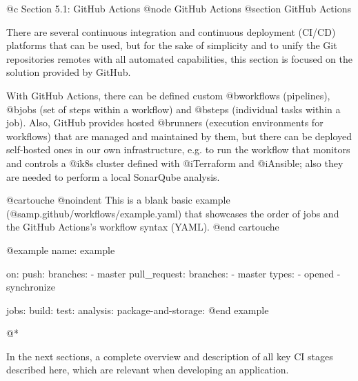 @c Section 5.1: GitHub Actions
@node GitHub Actions
@section GitHub Actions

There are several continuous integration and continuous deployment (CI/CD) platforms that can be used, but for the sake of simplicity and to unify the Git repositories remotes with all automated capabilities, this section is focused on the solution provided by GitHub.

With GitHub Actions, there can be defined custom @b{workflows} (pipelines), @b{jobs} (set of steps within a workflow) and @b{steps} (individual tasks within a job). Also, GitHub provides hosted @b{runners} (execution environments for workflows) that are managed and maintained by them, but there can be deployed self-hosted ones in our own infrastructure, e.g. to run the workflow that monitors and controls a @i{k8s cluster} defined with @i{Terraform} and @i{Ansible}; also they are needed to perform a local SonarQube analysis.

@cartouche
@noindent This is a blank basic example (@samp{.github/workflows/example.yaml}) that showcases the order of jobs and the GitHub Actions's workflow syntax (YAML).
@end cartouche

@example
name: example

on:
  push:
    branches:
      - master
  pull_request:
    branches:
      - master
    types:
      - opened
      - synchronize

jobs:
  build:
  test:
  analysis:
  package-and-storage:
@end example

@*

In the next sections, a complete overview and description of all key CI stages described here, which are relevant when developing an application.
